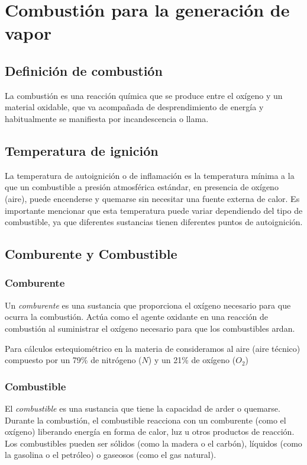 \section{Combustión para la generación de vapor}

\subsection{Definición de combustión}
La combustión es una reacción química que se produce entre el oxígeno y un material oxidable, que va acompañada de desprendimiento de energía y habitualmente se manifiesta por incandescencia o llama.

\subsection{Temperatura de ignición}


La temperatura de autoignición o de inflamación es la temperatura mínima a la que un combustible a presión atmosférica estándar, en presencia de oxígeno (aire), puede encenderse y quemarse sin necesitar una fuente externa de calor. Es importante mencionar que esta temperatura puede variar dependiendo del tipo de combustible, ya que diferentes sustancias tienen diferentes puntos de autoignición.

\subsection{Comburente y Combustible}

\subsubsection{Comburente}
Un \emph{comburente} es una sustancia que proporciona el oxígeno necesario para que ocurra la combustión. Actúa como el agente oxidante en una reacción de combustión al suministrar el oxígeno necesario para que los combustibles ardan.


Para cálculos estequiométrico en la materia de \materia consideramos al aire (aire técnico) compuesto por un 79\% de nitrógeno ($N$) y un 21\% de oxígeno ($O_2$)

\subsubsection{Combustible}
El \emph{combustible} es una sustancia que tiene la capacidad de arder o quemarse. Durante la combustión, el combustible reacciona con un comburente (como el oxígeno) liberando energía en forma de calor, luz u otros productos de reacción. Los combustibles pueden ser sólidos (como la madera o el carbón), líquidos (como la gasolina o el petróleo) o gaseosos (como el gas natural).


